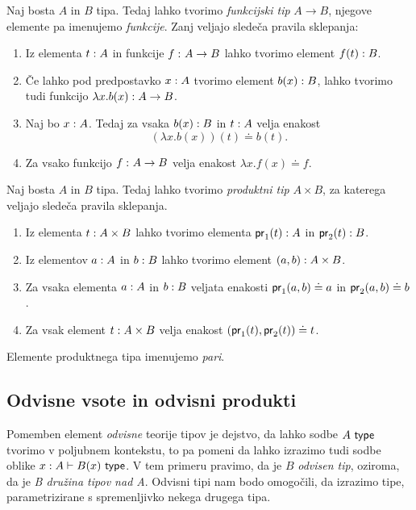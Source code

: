 \begin{definicija}
  Naj bosta \(A\) in \(B\) tipa. Tedaj lahko tvorimo \emph{funkcijski tip} \(A \to B\), njegove elemente pa imenujemo \emph{funkcije}.
  Zanj veljajo sledeča pravila sklepanja:
  \begin{enumerate}
  \item Iz elementa \(t : A\) in funkcije \(f \,\colon A \to B\) lahko tvorimo
    element \(f(t) : B\).
  \item Če lahko pod predpostavko \(x : A\) tvorimo element
    \(b(x) : B\), lahko tvorimo tudi funkcijo
    \({\lambda x.b(x) : A \to B}\).
  \item Naj bo \(x : A\). Tedaj za vsaka \(b(x) : B\) in
    \(t : A\) velja enakost \[(\lambda x.b(x))(t) \doteq b(t).\]
  \item Za vsako funkcijo \(f \,\colon A \to B\) velja enakost \(\lambda x.f(x) \doteq f\).
  \end{enumerate}
\end{definicija}
\begin{definicija}
  Naj bosta \(A\) in \(B\) tipa. Tedaj lahko tvorimo \emph{produktni tip} \(A \times B\),
  za katerega veljajo sledeča pravila sklepanja.
  \begin{enumerate}
  \item Iz elementa \(t : A \times B\) lahko tvorimo elementa \(\textnormal{\textsf{pr}}_{1}(t) : A\) in
    \(\textnormal{\textsf{pr}}_{2}(t) : B\).
  \item Iz elementov \(a : A\) in \(b : B\) lahko tvorimo
    element \((a, b) : A \times B\).
  \item Za vsaka elementa \(a : A\) in \(b : B\) veljata
    enakosti \(\textnormal{\textsf{pr}}_{1}(a, b) \doteq a\) in \(\textnormal{\textsf{pr}}_{2}(a, b) \doteq b\).
  \item Za vsak element \(t : A \times B\) velja enakost
    \((\textnormal{\textsf{pr}}_{1}(t), \textnormal{\textsf{pr}}_{2}(t)) \doteq t\).
  \end{enumerate}
  Elemente produktnega tipa imenujemo \emph{pari}.
\end{definicija}

\subsection{Odvisne vsote in odvisni produkti}
Pomemben element \emph{odvisne} teorije tipov je dejstvo, da lahko sodbe \(A\ \textnormal{\textsf{type}}\)
tvorimo v poljubnem kontekstu, to pa pomeni da lahko izrazimo tudi sodbe
oblike \(x : A \vdash B(x)\ \textnormal{\textsf{type}}\).
V tem primeru pravimo, da je \(B\) \emph{odvisen tip},
oziroma, da je \emph{B družina tipov nad A}. Odvisni tipi nam bodo omogočili, da izrazimo
tipe, parametrizirane s spremenljivko nekega drugega tipa.

